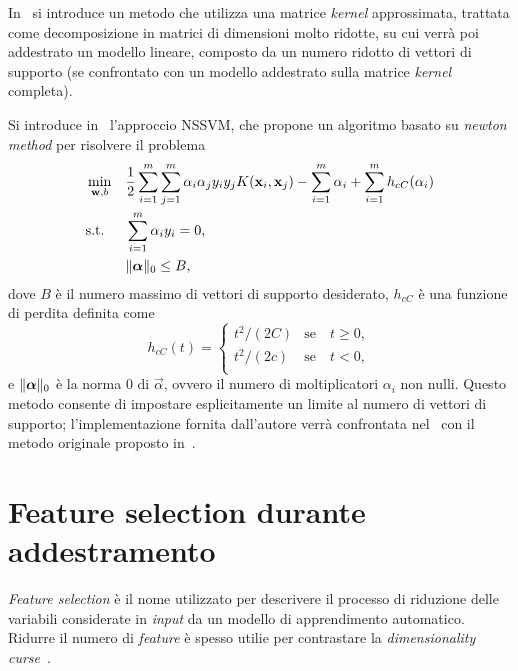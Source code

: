 
In~\cite{2012_LLSVM} si introduce un metodo che utilizza una matrice \emph{kernel} approssimata, trattata come decomposizione in matrici di dimensioni molto ridotte, su cui verrà poi addestrato un modello lineare, composto da un numero ridotto di vettori di supporto (se confrontato con un modello addestrato sulla matrice \emph{kernel} completa).

Si introduce in~\cite{2020_sparse_svm} l'approccio NSSVM, che propone un algoritmo basato su \emph{newton method} per risolvere il problema
\begin{equation*}
\begin{aligned}
& \min_{\vec{w}, b}     && \frac{1}{2}\sum_{i=1}^{m}\sum_{j=1}^{m}\alpha_i\alpha_jy_iy_jK(\Vec{x}_i, \Vec{x}_j) - \sum_{i=1}^{m}\alpha_i + \sum_{i=1}^{m} h_{cC}(\alpha_i)\\
&\textrm{s.t.}          && \sum_{i=1}^{m}\alpha_iy_i=0, \\
&                       && \norm{\Vec{\alpha}}_0 \leq B,
\end{aligned}
\end{equation*}
dove $B$ è il numero massimo di vettori di supporto desiderato, $h_{cC}$ è una funzione di perdita definita come
\begin{equation*}
h_{cC}(t) = \begin{cases}
            t^2/(2C) & \text{se} \quad t \geq 0, \\
            t^2/(2c) & \text{se} \quad t < 0, \\
            \end{cases}
\end{equation*}
e $\norm{\Vec{\alpha}}_0$ è la norma 0 di $\Vec{\alpha}$, ovvero il numero di moltiplicatori $\alpha_i$ non nulli.
Questo metodo consente di impostare esplicitamente un limite al numero di vettori di supporto; 
l'implementazione fornita dall'autore verrà confrontata nel~ con il metodo originale proposto in~.

\section{Feature selection durante addestramento}\label{sec:sparsesvm:feature-selection}
\emph{Feature selection} è il nome utilizzato per descrivere il processo di riduzione delle variabili considerate in \emph{input} da un modello di apprendimento automatico.
Ridurre il numero di \emph{feature} è spesso utilie per contrastare la \emph{dimensionality curse}~\cite{elements-of-statistical-learning}.

